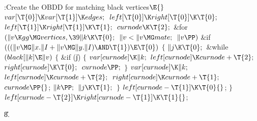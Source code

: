 \Y\B\4:Create the OBDD for matching black vertices\X${}\E{}$\6
$\\{var}[\T{0}]\K\\{var}[\T{1}]\K\\{edges};{}$\6
${}\\{left}[\T{0}]\K\\{right}[\T{0}]\K\T{0};{}$\6
${}\\{left}[\T{1}]\K\\{right}[\T{1}]\K\T{1};{}$\6
${}\\{curnode}\K\T{2};{}$\6
\&{for} ${}(\|v\K\\{gg}\MG\\{vertices},\39\|k\K\T{0};{}$ ${}\|v<\|v\MG%
\\{mate};{}$ ${}\|v\PP){}$\1\6
\&{if} ${}(((\|v\MG\|x.\|I+\|v\MG\|y.\|I)\AND\T{1})\E\T{0}){}$\5
${}\{{}$\1\6
${}\|j\K\T{0};{}$\6
\&{while} ${}(\\{black}[\|k]\E\|v){}$\5
${}\{{}$\1\6
\&{if} (\|j)\5
${}\{{}$\1\6
${}\\{var}[\\{curnode}]\K\|k;{}$\6
${}\\{left}[\\{curnode}]\K\\{curnode}+\T{2};{}$\6
${}\\{right}[\\{curnode}]\K\T{0};{}$\6
${}\\{curnode}\PP;{}$\6
\4${}\}{}$\2\6
${}\\{var}[\\{curnode}]\K\|k;{}$\6
${}\\{left}[\\{curnode}]\K\\{curnode}+\T{2};{}$\6
${}\\{right}[\\{curnode}]\K\\{curnode}+\T{1};{}$\6
${}\\{curnode}\PP{}$;\6
${}\|k\PP;{}$\6
${}\|j\K\T{1};{}$\6
\4${}\}{}$\2\6
${}\\{left}[\\{curnode}-\T{1}]\K\T{0}{}$;\6
\4${}\}{}$\2\2\6
${}\\{left}[\\{curnode}-\T{2}]\K\\{right}[\\{curnode}-\T{1}]\K\T{1}{}$;\par
\U8.\fi

